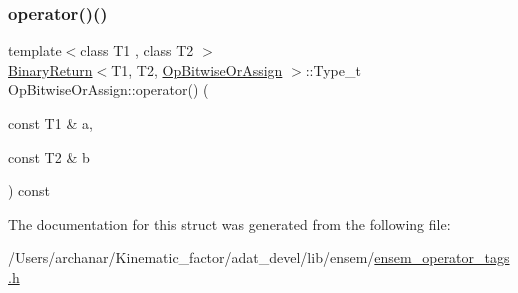 \mbox{\label{structOpBitwiseOrAssign_abdf5c9f46dce33611878cf271e3b7a09}} 
\subsubsection{\texorpdfstring{operator()()}{operator()()}\hspace{0.1cm}{\footnotesize\ttfamily [2/2]}}
{\footnotesize\ttfamily template$<$class T1 , class T2 $>$ \\
\mbox{\hyperlink{structBinaryReturn}{Binary\+Return}}$<$T1, T2, \mbox{\hyperlink{structOpBitwiseOrAssign}{Op\+Bitwise\+Or\+Assign}} $>$\+::Type\+\_\+t Op\+Bitwise\+Or\+Assign\+::operator() (\begin{DoxyParamCaption}\item[{const T1 \&}]{a,  }\item[{const T2 \&}]{b }\end{DoxyParamCaption}) const\hspace{0.3cm}{\ttfamily [inline]}}



The documentation for this struct was generated from the following file\+:\begin{DoxyCompactItemize}
\item 
/\+Users/archanar/\+Kinematic\+\_\+factor/adat\+\_\+devel/lib/ensem/\mbox{\hyperlink{lib_2ensem_2ensem__operator__tags_8h}{ensem\+\_\+operator\+\_\+tags.\+h}}\end{DoxyCompactItemize}
